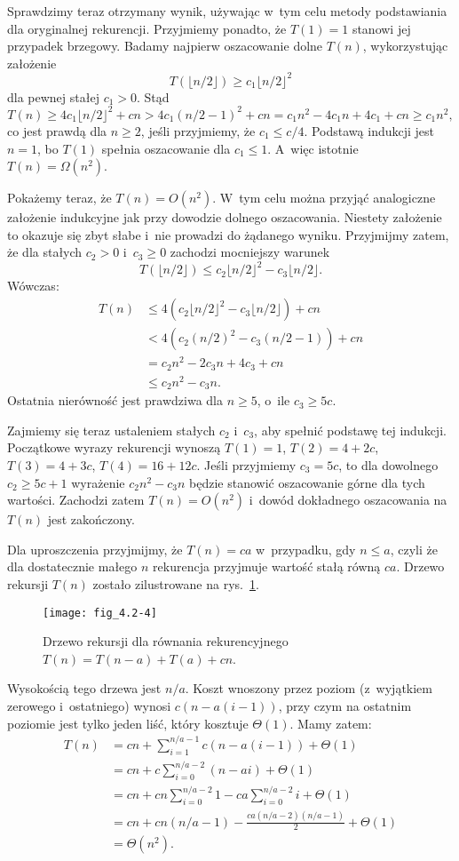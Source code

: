 Sprawdzimy teraz otrzymany wynik, używając w~tym celu metody podstawiania dla oryginalnej rekurencji.
Przyjmiemy ponadto, że $T(1)=1$ stanowi jej przypadek brzegowy.
Badamy najpierw oszacowanie dolne $T(n)$, wykorzystując założenie
\[
	T(\lfloor n/2\rfloor) \ge c_1\lfloor n/2\rfloor^2
\]
dla pewnej stałej $c_1>0$.
Stąd
\[
	T(n) \ge 4c_1\lfloor n/2\rfloor^2+cn > 4c_1(n/2-1)^2+cn = c_1n^2-4c_1n+4c_1+cn \ge c_1n^2,
\]
co jest prawdą dla $n\ge2$, jeśli przyjmiemy, że $c_1\le c/4$.
Podstawą indukcji jest $n=1$, bo $T(1)$ spełnia oszacowanie dla $c_1\le1$.
A~więc istotnie $T(n)=\Omega(n^2)$.

Pokażemy teraz, że $T(n)=O(n^2)$.
W~tym celu można przyjąć analogiczne założenie indukcyjne jak przy dowodzie dolnego oszacowania.
Niestety założenie to okazuje się zbyt słabe i~nie prowadzi do żądanego wyniku.
Przyjmijmy zatem, że dla stałych $c_2>0$ i~$c_3\ge0$ zachodzi mocniejszy warunek
\[
	T(\lfloor n/2\rfloor) \le c_2\lfloor n/2\rfloor^2-c_3\lfloor n/2\rfloor.
\]
Wówczas:
\begin{align*}
	T(n) &\le 4(c_2\lfloor n/2\rfloor^2-c_3\lfloor n/2\rfloor)+cn \\
	&< 4(c_2(n/2)^2-c_3(n/2-1))+cn \\
	&= c_2n^2-2c_3n+4c_3+cn \\
	&\le c_2n^2-c_3n.
\end{align*}
Ostatnia nierówność jest prawdziwa dla $n\ge5$, o~ile $c_3\ge5c$.

Zajmiemy się teraz ustaleniem stałych $c_2$ i~$c_3$, aby spełnić podstawę tej indukcji.
Początkowe wyrazy rekurencji wynoszą $T(1)=1$, $T(2)=4+2c$, $T(3)=4+3c$, $T(4)=16+12c$.
Jeśli przyjmiemy $c_3=5c$, to dla dowolnego $c_2\ge5c+1$ wyrażenie $c_2n^2-c_3n$ będzie stanowić oszacowanie górne dla tych wartości.
Zachodzi zatem $T(n)=O(n^2)$ i~dowód dokładnego oszacowania na $T(n)$ jest zakończony.

\exercise %
Dla uproszczenia przyjmijmy, że $T(n)=ca$ w~przypadku, gdy $n\le a$, czyli że dla dostatecznie małego $n$ rekurencja przyjmuje wartość stałą równą $ca$.
Drzewo rekursji $T(n)$ zostało zilustrowane na rys.\ \ref{fig:4.2-4}.
\begin{figure}[ht]
	\begin{center}
		\texttt{[image: fig\_4.2-4]}
	\end{center}
	\caption{Drzewo rekursji dla równania rekurencyjnego $T(n)=T(n-a)+T(a)+cn$.} \label{fig:4.2-4}
\end{figure}
Wysokością tego drzewa jest $n/a$.
Koszt wnoszony przez  poziom (z~wyjątkiem zerowego i~ostatniego) wynosi $c(n-a(i-1))$, przy czym na ostatnim poziomie jest tylko jeden liść, który kosztuje $\Theta(1)$.
Mamy zatem:
\begin{align*}
	T(n) &= cn+\sum_{i=1}^{n/a-1}c(n-a(i-1))+\Theta(1) \\
	&= cn+c\sum_{i=0}^{n/a-2}(n-ai)+\Theta(1) \\
	&= cn+cn\sum_{i=0}^{n/a-2}1-ca\sum_{i=0}^{n/a-2}i+\Theta(1) \\
	&= cn+cn(n/a-1)-\frac{ca(n/a-2)(n/a-1)}{2}+\Theta(1) \\
	&= \Theta(n^2).
\end{align*}

